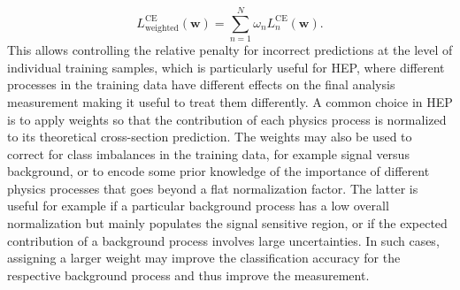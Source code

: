 \begin{equation}
    L_{\text{weighted}}^{\text{CE}}(\pmb{w}) = \sum _{n=1}^{N} \omega_n L_n^{\text{CE}}(\pmb{w}).
\end{equation}
This allows controlling the relative penalty for incorrect predictions at the level of individual training samples, which is particularly useful for HEP, where different processes in the training data have different effects on the final analysis measurement making it useful to treat them differently.
A common choice in HEP is to apply weights so that the contribution of each physics process is normalized to its theoretical cross-section prediction.
The weights may also be used to correct for class imbalances in the training data, for example signal versus background, or to encode some prior knowledge of the importance of different physics processes that goes beyond a flat normalization factor. The latter is useful for example if a particular background process has a low overall normalization but mainly populates the signal sensitive region, or if the expected contribution of a background process involves large uncertainties.
In such cases, assigning a larger weight may improve the classification accuracy for the respective background process and thus improve the measurement.

